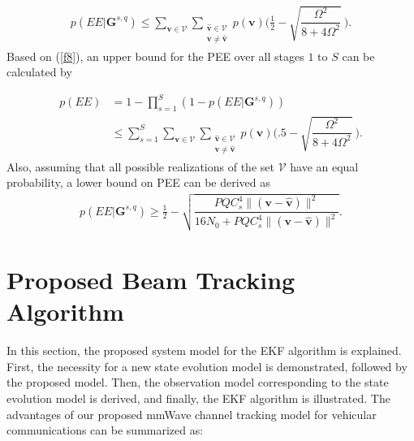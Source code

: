 \documentclass{ieeeaccess}
\begin{document}
\begin{align} \label{f8}
p(EE|\boldsymbol{G}^{s,q})
\leq \sum_{\boldsymbol{v}\in \mathcal{V}}\sum_{\substack{\boldsymbol{\hat{v}} \in \mathcal{V}\\ \boldsymbol{v}\neq \boldsymbol{\hat{v}}}} p(\boldsymbol{v})\bigg(\frac{1}{2}-\sqrt{\dfrac{\Omega^2}{8+4\Omega^2}}\  \bigg).
\end{align}
%
Based on (\ref{f8}), an upper bound for the PEE over all stages $1 \textrm{ to }S$ can be calculated by

\begin{align} \label{f9}
p(EE) &= 1- \prod_{s=1}^{S}(1-p(EE|\boldsymbol{G}^{s,q}))\nonumber \\
&\leq  \sum_{s=1}^{S}\sum_{\boldsymbol{v}\in \mathcal{V}}\sum_{\substack{\boldsymbol{\hat{v}} \in \mathcal{V}\\ \boldsymbol{v}\neq \boldsymbol{\hat{v}}}} p(\boldsymbol{v})\bigg(.5-\sqrt{\dfrac{\Omega^2}{8+4\Omega^2}}\  \bigg).
\end{align}
Also, assuming that all possible realizations of the set $\mathcal{V}$ have an equal probability, a lower bound on PEE can be derived as
\begin{align} \label{f10}
p(EE|\boldsymbol{G}^{s,q})
\geq \frac{1}{2}-\sqrt{\dfrac{PQC_s^4\|(\boldsymbol{v}- \boldsymbol{\hat{v}})  \|^2}{16N_0+PQC_s^4\|(\boldsymbol{v}- \boldsymbol{\hat{v}})  \|^2}}.
\end{align}

\section{Proposed Beam Tracking Algorithm}\label{Proposed beam tracking algorithm}
In this section, the proposed system model for the EKF algorithm is explained. First, the necessity for a new state evolution model is demonstrated, followed by the proposed model. Then, the observation model corresponding to the state evolution model is derived, and finally, the EKF algorithm is illustrated. The advantages of our proposed mmWave channel tracking model for vehicular communications can be summarized as:
\end{document}
